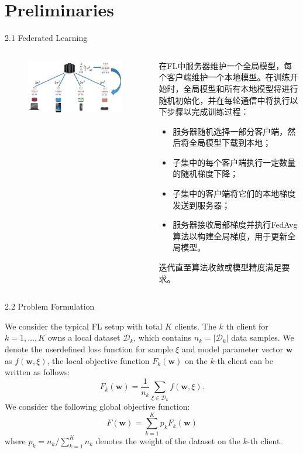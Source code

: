 \documentclass{sintefbeamer}
\theoremstyle{definition}
\begin{document}
\section{Preliminaries}

\begin{frame}{2.1 Federated Learning}

\begin{columns}
\begin{column}{0.4\textwidth}
\begin{figure}[ht]
\centering
\includegraphics[width=1\textwidth]{images/fl_arch}
\end{figure}
\end{column}
\begin{column}{0.6\textwidth}
 在FL中服务器维护一个全局模型，每个客户端维护一个本地模型。在训练开始时，全局模型和所有本地模型将进行随机初始化，并在每轮通信中将执行以下步骤以完成训练过程：
\begin{itemize}
\item 服务器随机选择一部分客户端，然后将全局模型下载到本地；
\item 子集中的每个客户端执行一定数量的随机梯度下降；
\item 子集中的客户端将它们的本地梯度发送到服务器；
\item 服务器接收局部梯度并执行FedAvg算法以构建全局梯度，用于更新全局模型。
\end{itemize}
迭代直至算法收敛或模型精度满足要求。
\end{column}
\end{columns}


\end{frame}

\begin{frame}{2.2 Problem Formulation}

We consider the typical FL setup with total $K$ clients. The $k$ th client for $k=1, \ldots, K$ owns a local dataset $\mathcal{D}_k$, which contains $n_k=\left|\mathcal{D}_k\right|$ data samples. We denote the userdefined loss function for sample $\xi$ and model parameter vector $\mathbf{w}$ as $f(\mathbf{w}, \xi)$, the local objective function $F_k(\mathbf{w})$ on the $k$-th client can be written as follows:
$$
F_k(\mathbf{w})=\frac{1}{n_k} \sum_{\xi \in \mathcal{D}_k} f(\mathbf{w}, \xi) .
$$
We consider the following global objective function:
$$
F(\mathbf{w})=\sum_{k=1}^K p_k F_k(\mathbf{w})
$$
where $p_k=n_k / \sum_{k=1}^K n_k$ denotes the weight of the dataset on the $k$-th client. 
\end{frame}
\end{document}
